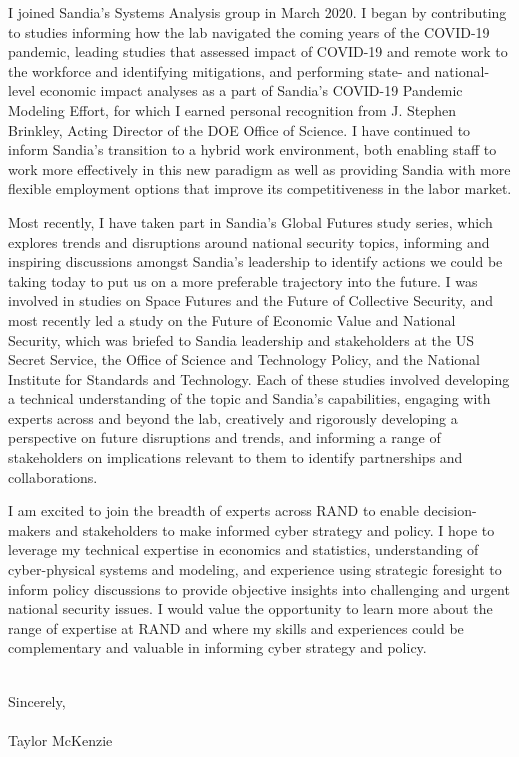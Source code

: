 \documentclass[10pt]{article}
\begin{document}
I joined Sandia's Systems Analysis group in March 2020. I began by contributing to studies informing how the lab navigated the coming years of the COVID-19 pandemic, leading studies that assessed impact of COVID-19 and remote work to the workforce and identifying mitigations, and performing state- and national-level economic impact analyses as a part of Sandia's COVID-19 Pandemic Modeling Effort, for which I earned personal recognition from J. Stephen Brinkley, Acting Director of the DOE Office of Science. I have continued to inform Sandia's transition to a hybrid work environment, both enabling staff to work more effectively in this new paradigm as well as providing Sandia with more flexible employment options that improve its competitiveness in the labor market.

Most recently, I have taken part in Sandia's Global Futures study series, which explores trends and disruptions around national security topics, informing and inspiring discussions amongst Sandia's leadership to identify actions we could be taking today to put us on a more preferable trajectory into the future. I was involved in studies on Space Futures and the Future of Collective Security, and most recently led a study on the Future of Economic Value and National Security, which was briefed to Sandia leadership and stakeholders at the US Secret Service, the Office of Science and Technology Policy, and the National Institute for Standards and Technology. Each of these studies involved developing a technical understanding of the topic and Sandia's capabilities, engaging with experts across and beyond the lab, creatively and rigorously developing a perspective on future disruptions and trends, and informing a range of stakeholders on implications relevant to them to identify partnerships and collaborations.

I am excited to join the breadth of experts across RAND to enable decision-makers and stakeholders to make informed cyber strategy and policy. I hope to leverage my technical expertise in economics and statistics, understanding of cyber-physical systems and modeling, and experience using strategic foresight to inform policy discussions to provide objective insights into challenging and urgent national security issues. I would value the opportunity to learn more about the range of expertise at RAND and where my skills and experiences could be complementary and valuable in informing cyber strategy and policy.

\noindent \\Sincerely,\\\\
Taylor McKenzie
\end{document}
